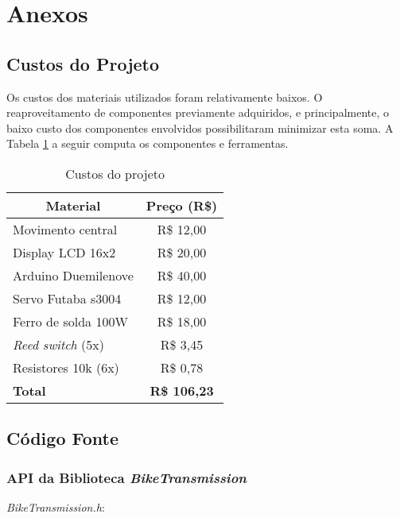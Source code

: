 \documentclass[a4paper,11pt]{article}
\begin{document}
\pagebreak
%
\section{Anexos}
\label{sec:anexos}

%

%
\subsection{Custos do Projeto}
\label{custos}
Os custos dos materiais utilizados foram relativamente baixos. O
reaproveitamento de componentes previamente adquiridos, e principalmente, o
baixo custo dos componentes envolvidos possibilitaram minimizar esta soma. A
Tabela \ref{tab:custos} a seguir computa os componentes e ferramentas.
{
\newcommand{\mc}[3]{\multicolumn{#1}{#2}{#3}}
\begin{table}[ht]
\begin{center}
\caption{Custos do projeto}
\label{tab:custos}
\begin{tabular}{lc}
\mc{1}{c}{\textbf{Material}} & \textbf{Preço (R\$)}\\\hline
Movimento central & R\$ 12,00\\
Display LCD 16x2 & R\$ 20,00\\
Arduino Duemilenove & R\$ 40,00\\
Servo Futaba s3004 & R\$ 12,00\\
Ferro de solda 100W & R\$ 18,00\\
\textit{Reed switch} (5x) & R\$ 3,45\\
Resistores 10k (6x) & R\$ 0,78\\\hline
\textbf{Total} & \textbf{R\$ 106,23}\\\hline
\end{tabular}
\end{center}
\end{table}
}



%
\subsection{Código Fonte}
\label{codigo}

\subsubsection{API da Biblioteca \textit{BikeTransmission}}
\label{code:api}
\textit{BikeTransmission.h}:

\end{document}
